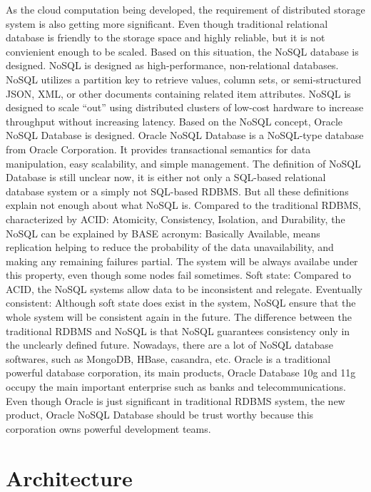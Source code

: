 As the cloud computation being developed, the requirement of distributed storage system is also getting more significant. Even though traditional relational database is friendly to the storage space and highly reliable, but it is not convienient enough to be scaled. Based on this situation, the NoSQL database is designed. 
NoSQL is designed as high-performance, non-relational databases. NoSQL utilizes a partition key to retrieve values, column sets, or semi-structured JSON, XML, or other documents containing related item attributes. NoSQL is designed to scale “out” using distributed clusters of low-cost hardware to increase throughput without increasing latency.
Based on the NoSQL concept, Oracle NoSQL Database is designed. Oracle NoSQL Database is a NoSQL-type database from Oracle Corporation. It provides transactional semantics for data manipulation, easy scalability, and simple management.
The definition of NoSQL Database is still unclear now, it is either not only a SQL-based relational database system or a simply not SQL-based RDBMS. But all these definitions explain not enough about what NoSQL is. Compared to the traditional RDBMS, characterized by ACID: Atomicity, Consistency, Isolation, and Durability, the NoSQL can be explained by BASE acronym:
Basically Available, means replication helping to reduce the probability of the data unavailability, and making any remaining failures partial. The system will be always availabe under this property, even though some nodes fail sometimes.
Soft state: Compared to ACID, the NoSQL systems allow data to be inconsistent and relegate.
Eventually consistent: Although soft state does exist in the system, NoSQL ensure that the whole system will be consistent again in the future. The difference between the traditional RDBMS and NoSQL is that NoSQL guarantees consistency only in the unclearly defined future.
Nowadays, there are a lot of NoSQL database softwares, such as MongoDB, HBase, casandra, etc. Oracle is a traditional powerful database corporation, its main products, Oracle Database 10g and 11g occupy the main important enterprise such as banks and 
telecommunications. Even though Oracle is just significant in traditional RDBMS system, the new product, Oracle NoSQL Database should be trust worthy because this corporation owns powerful development teams. 


\section{Architecture}

